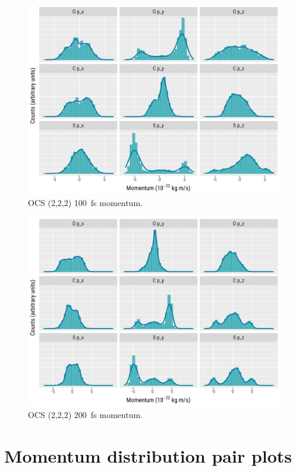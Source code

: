 \begin{figure}
  \centering
  \includegraphics[width=\textwidth]{Plots/OCS222100fsMomentum}
  \caption[OCS (2,2,2) \SI{100}{\fs} momentum.]
  {OCS (2,2,2) \SI{100}{\fs} momentum.}
  \label{fig:OCS222100fsMomentum}
\end{figure}

\begin{figure}
  \centering
  \includegraphics[width=\textwidth]{Plots/OCS222200fsMomentum}
  \caption[OCS (2,2,2) \SI{200}{\fs} momentum.]
  {OCS (2,2,2) \SI{200}{\fs} momentum.}
  \label{fig:OCS222200fsMomentum}
\end{figure}

\section{Momentum distribution pair plots}

